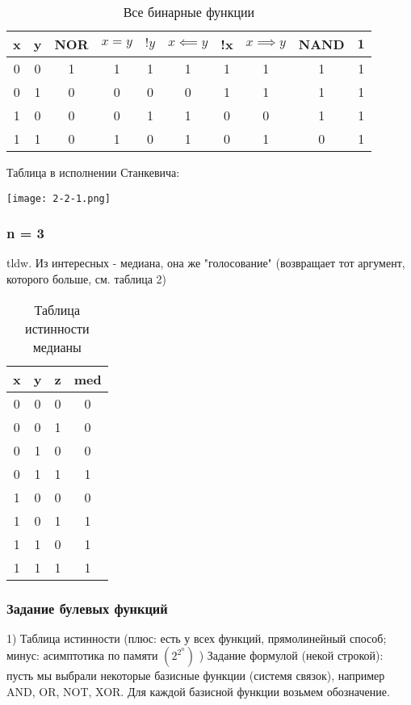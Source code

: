 \documentclass{article}
\begin{document}
\begin{table}
    \centering
    \begin{tabular}{ |c|c|c|c|c|c|c|c|c|c| }
        \hline
         x & y & NOR & $x = y$ & $!y$ & $x \impliedby y$ & !x & $x \implies y$ & NAND & $\mathbf{1}$ \\
         \hline
         0 & 0 & 1 & 1 & 1 & 1 & 1 & 1 & 1 & 1 \\
         0 & 1 & 0 & 0 & 0 & 0 & 1 & 1 & 1 & 1 \\
         1 & 0 & 0 & 0 & 1 & 1 & 0 & 0 & 1 & 1 \\
         1 & 1 & 0 & 1 & 0 & 1 & 0 & 1 & 0 & 1 \\
         \hline
    \end{tabular}
    \caption{Все бинарные функции}
    \label{tab:my_label}
\end{table}

Таблица в исполнении Станкевича:
\begin{center}
  \texttt{[image: 2-2-1.png]}
\end{center}

\subsubsection{n = 3}
tldw.
Из интересных - медиана, она же "голосование" (возвращает тот аргумент, которого больше, см. таблица 2)


\begin{table}
    \centering
    \begin{tabular}{ |c|c|c|c| }
        \hline
         x & y & z & med \\
        \hline
         0 & 0 & 0 & 0 \\
         0 & 0 & 1 & 0 \\
         0 & 1 & 0 & 0 \\
         0 & 1 & 1 & 1 \\
         1 & 0 & 0 & 0 \\
         1 & 0 & 1 & 1 \\
         1 & 1 & 0 & 1 \\
         1 & 1 & 1 & 1 \\
        \hline
    \end{tabular}
    \caption{Таблица истинности медианы}
\end{table}

\subsubsection{Задание булевых функций}
1) Таблица истинности (плюс: есть у всех функций, прямолинейный способ; минус: асимптотика по памяти $(2^{2^{n}})$ ) Задание формулой (некой строкой): пусть мы выбрали некоторые базисные функции (системя связок), например AND, OR, NOT, XOR. Для каждой базисной функции возьмем обозначение.
\end{document}
